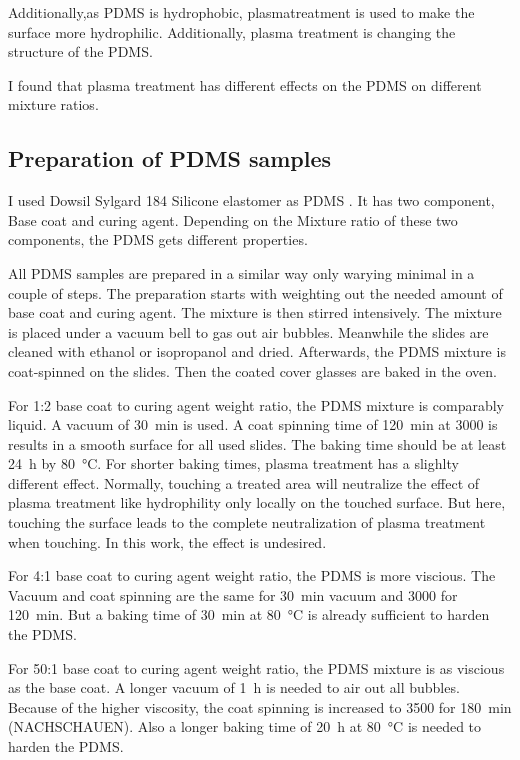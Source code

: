 Additionally,as PDMS is hydrophobic, plasmatreatment is used to make the surface more hydrophilic. Additionally, plasma treatment is changing the structure of the PDMS. 

I found that plasma treatment has different effects on the PDMS on different mixture ratios. 

\subsection{Preparation of PDMS samples}

I used Dowsil Sylgard 184 Silicone elastomer as PDMS \cite{DOW.}. It has two component, Base coat and curing agent. Depending on the Mixture ratio of these two components, the PDMS gets different properties. 

All PDMS samples are prepared in a similar way only warying minimal in a couple of steps. The preparation starts with weighting out the needed amount of base coat and curing agent. The mixture is then stirred intensively. The mixture is placed under a vacuum bell to gas out air bubbles. Meanwhile the slides are cleaned with ethanol or isopropanol and dried. Afterwards, the PDMS mixture is coat-spinned on the slides. Then the coated cover glasses are baked in the oven.

For 1:2 base coat to curing agent weight ratio, the PDMS mixture is comparably liquid. A vacuum of \SI{30}{\minute} is used. A coat spinning time of \SI{120}{\minute} at \SI{3000}{\rpm} is results in a smooth surface for all used slides. The baking time should be at least \SI{24}{\hour} by \SI{80}{\degreeCelsius}. For shorter baking times, plasma treatment has a slighlty different effect. Normally, touching a treated area will neutralize the effect of plasma treatment like hydrophility only locally on the touched surface. But here, touching the surface leads to the complete neutralization of plasma treatment when touching. In this work, the effect is undesired. 
 
For 4:1 base coat to curing agent weight ratio, the PDMS is more viscious. The Vacuum and coat spinning are the same for \SI{30}{\minute} vacuum and \SI{3000}{\rpm} for \SI{120}{\minute}. But a baking time of \SI{30}{\minute} at \SI{80}{\degreeCelsius} is already sufficient to harden the PDMS. 

For 50:1 base coat to curing agent weight ratio, the PDMS mixture is as viscious as the base coat. A longer vacuum of \SI{1}{\hour} is needed to air out all bubbles. Because of the higher viscosity, the coat spinning is increased to \SI{3500}{\rpm} for \SI{180}{\minute} (NACHSCHAUEN). Also a longer baking time of \SI{20}{\hour} at \SI{80}{\degreeCelsius} is needed to harden the PDMS. 

